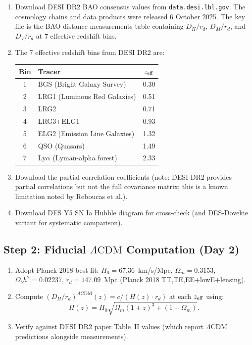 \documentclass[11pt]{article}
\newcommand{\LCDM}{\Lambda\text{CDM}}
\begin{document}
\begin{enumerate}[label=\textbf{1.\arabic*:}, nosep]
\item Download DESI DR2 BAO consensus values from
  \texttt{data.desi.lbl.gov}. The cosmology chains and data products
  were released 6 October 2025. The key file is the BAO distance
  measurements table containing $D_H/r_d$, $D_M/r_d$, and $D_V/r_d$
  at 7 effective redshift bins.

\item The 7 effective redshift bins from DESI DR2 are:
  \begin{center}
  \begin{tabular}{@{}clc@{}}
  \toprule
  \textbf{Bin} & \textbf{Tracer} & \textbf{$z_{\rm eff}$} \\
  \midrule
  1 & BGS (Bright Galaxy Survey) & 0.30 \\
  2 & LRG1 (Luminous Red Galaxies) & 0.51 \\
  3 & LRG2 & 0.71 \\
  4 & LRG3+ELG1 & 0.93 \\
  5 & ELG2 (Emission Line Galaxies) & 1.32 \\
  6 & QSO (Quasars) & 1.49 \\
  7 & Ly$\alpha$ (Lyman-alpha forest) & 2.33 \\
  \bottomrule
  \end{tabular}
  \end{center}

\item Download the partial correlation coefficients (note: DESI DR2
  provides partial correlations but not the full covariance matrix;
  this is a known limitation noted by Reboucas et al.).

\item Download DES Y5 SN Ia Hubble diagram for cross-check
  (and DES-Dovekie variant for systematic comparison).
\end{enumerate}

\subsection{Step 2: Fiducial $\LCDM$ Computation (Day 2)}

\begin{enumerate}[label=\textbf{2.\arabic*:}, nosep]
\item Adopt Planck 2018 best-fit: $H_0 = 67.36$~km/s/Mpc,
  $\Omega_m = 0.3153$, $\Omega_b h^2 = 0.02237$,
  $r_d = 147.09$~Mpc (Planck 2018 TT,TE,EE+lowE+lensing).

\item Compute $(D_H/r_d)^{\LCDM}(z) = c/(H(z) \cdot r_d)$ at each
  $z_{\rm eff}$ using:
  \begin{equation}
  H(z) = H_0 \sqrt{\Omega_m(1+z)^3 + (1-\Omega_m)}.
  \end{equation}

\item Verify against DESI DR2 paper Table~II values (which report
  $\LCDM$ predictions alongside measurements).
\end{enumerate}
\end{document}
